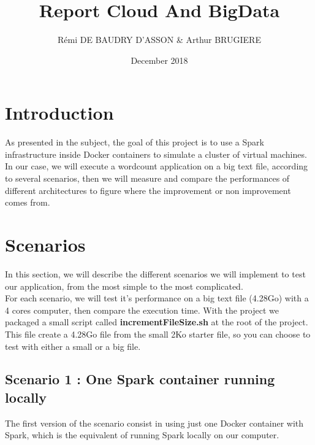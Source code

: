 \documentclass{article}
\title{Report Cloud And BigData}
\author{Rémi DE BAUDRY D'ASSON & Arthur BRUGIERE}
\date{December 2018}
\begin{document}
\maketitle

\section{Introduction}

As presented in the subject, the goal of this project is to use a Spark infrastructure inside Docker containers to simulate a cluster of virtual machines. \\

\noindent In our case, we will execute a wordcount application on a big text file, according to several scenarios, then we will measure and compare the performances of different architectures to figure where the improvement or non improvement comes from.

\section{Scenarios}

In this section, we will describe the different scenarios we will implement to test our application, from the most simple to the most complicated. \\

\noindent For each scenario, we will test it's performance on a big text file (4.28Go) with a 4 cores computer, then compare the execution time. With the project we packaged a small script called \textbf{incrementFileSize.sh} at the root of the project. This file create a 4.28Go file from the small 2Ko starter file, so you can choose to test with either a small or a big file.



\subsection{Scenario 1 : One Spark container running locally}

The first version of the scenario consist in using just one Docker container with Spark, which is the equivalent of running Spark locally on our computer. \\
\end{document}
